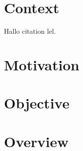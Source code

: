 \section{Context}
Hallo citation \cite{latexcompanion} lel.
\section{Motivation}
\section{Objective}
\section{Overview}